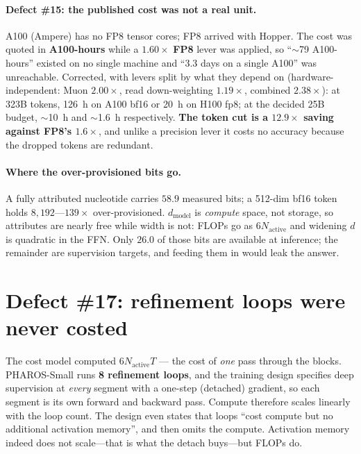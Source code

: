 \documentclass[11pt,a4paper]{article}
\begin{document}
\paragraph{Defect \#15: the published cost was not a real unit.} A100 (Ampere)
has no FP8 tensor cores; FP8 arrived with Hopper. The cost was quoted in
\textbf{A100-hours} while a $1.60\times$ \textbf{FP8} lever was applied, so
``$\sim$79 A100-hours'' existed on no single machine and ``3.3 days on a single
A100'' was unreachable. Corrected, with levers split by what they depend on
(hardware-independent: Muon $2.00\times$, read down-weighting $1.19\times$,
combined $2.38\times$): at 323B tokens, 126~h on A100 bf16 or 20~h on H100 fp8;
at the decided 25B budget, $\sim$10~h and $\sim$1.6~h respectively.
\textbf{The token cut is a $12.9\times$ saving against FP8's $1.6\times$}, and
unlike a precision lever it costs no accuracy because the dropped tokens are
redundant.

\paragraph{Where the over-provisioned bits go.} A fully attributed nucleotide
carries $58.9$ measured bits; a 512-dim bf16 token holds $8{,}192$---$139\times$
over-provisioned. $d_{\text{model}}$ is \emph{compute} space, not storage, so
attributes are nearly free while width is not: FLOPs go as $6N_{\text{active}}$
and widening $d$ is quadratic in the FFN. Only $26.0$ of those bits are
available at inference; the remainder are supervision targets, and feeding them
in would leak the answer.

\section{Defect \#17: refinement loops were never costed}
\label{sec:loops}

The cost model computed $6 N_{\text{active}} T$ --- the cost of \emph{one} pass
through the blocks. PHAROS-Small runs \textbf{8 refinement loops}, and the
training design specifies deep supervision at \emph{every} segment with a
one-step (detached) gradient, so each segment is its own forward and backward
pass. Compute therefore scales linearly with the loop count. The design even
states that loops ``cost compute but no additional activation memory'', and then
omits the compute. Activation memory indeed does not scale---that is what the
detach buys---but FLOPs do.
\end{document}
